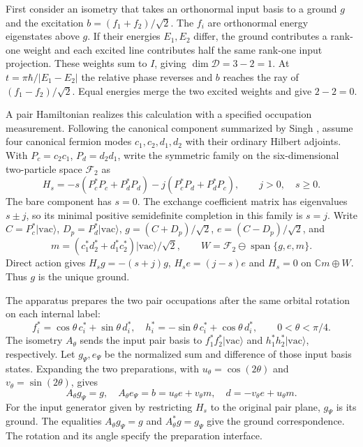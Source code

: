 \documentclass[11pt]{article}
\theoremstyle{definition}
\DeclareMathOperator{\Span}{span}
\newcommand{\C}{\mathbb C}
\newcommand{\ket}[1]{\lvert #1\rangle}
\begin{document}
First consider an isometry that takes an orthonormal input basis to a ground $g$ and the excitation $b=(f_1+f_2)/\sqrt2$. The $f_i$ are orthonormal energy eigenstates above $g$. If their energies $E_1,E_2$ differ, the ground contributes a rank-one weight and each excited line contributes half the same rank-one input projection. These weights sum to $I$, giving $\dim\mathcal D=3-2=1$. At $t=\pi\hbar/|E_1-E_2|$ the relative phase reverses and $b$ reaches the ray of $(f_1-f_2)/\sqrt2$. Equal energies merge the two excited weights and give $2-2=0$.

A pair Hamiltonian realizes this calculation with a specified occupation measurement. Following the canonical component summarized by Singh \cite[Sec.~3.4, Eqs.~(3.11)--(3.12)]{Singh2026PairTransfer}, assume four canonical fermion modes $c_1,c_2,d_1,d_2$ with their ordinary Hilbert adjoints. With $P_c=c_2c_1$, $P_d=d_2d_1$, write the symmetric family on the six-dimensional two-particle space $\mathcal F_2$ as
\[
 H_s=-s(P_c^*P_c+P_d^*P_d)-j(P_c^*P_d+P_d^*P_c),\qquad j>0,\quad s\geq0 .
\]
The bare component has $s=0$. The exchange coefficient matrix has eigenvalues $s\pm j$, so its minimal positive semidefinite completion in this family is $s=j$. Write $C=P_c^*\ket{\mathrm{vac}}$, $D_p=P_d^*\ket{\mathrm{vac}}$, $g=(C+D_p)/\sqrt2$, $e=(C-D_p)/\sqrt2$, and
\[
 m=(c_1^*d_2^*+d_1^*c_2^*)\ket{\mathrm{vac}}/\sqrt2,\qquad
 W=\mathcal F_2\ominus\Span\{g,e,m\}.
\]
Direct action gives $H_sg=-(s+j)g$, $H_se=(j-s)e$ and $H_s=0$ on $\C m\oplus W$. Thus $g$ is the unique ground.

The apparatus prepares the two pair occupations after the same orbital rotation on each internal label:
\[
 f_i^*=\cos\theta\,c_i^*+\sin\theta\,d_i^*,\quad
 h_i^*=-\sin\theta\,c_i^*+\cos\theta\,d_i^*,\qquad 0<\theta<\pi/4.
\]
The isometry $A_\theta$ sends the input pair basis to $f_1^*f_2^*\ket{\mathrm{vac}}$ and $h_1^*h_2^*\ket{\mathrm{vac}}$, respectively. Let $g_\Psi,e_\Psi$ be the normalized sum and difference of those input basis states. Expanding the two preparations, with $u_\theta=\cos(2\theta)$ and $v_\theta=\sin(2\theta)$, gives
\[
 A_\theta g_\Psi=g,\quad A_\theta e_\Psi=b=u_\theta e+v_\theta m,\quad
 d=-v_\theta e+u_\theta m .
\]
For the input generator given by restricting $H_s$ to the original pair plane, $g_\Psi$ is its ground. The equalities $A_\theta g_\Psi=g$ and $A_\theta^*g=g_\Psi$ give the ground correspondence. The rotation and its angle specify the preparation interface.
\end{document}
